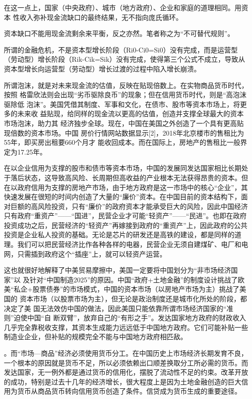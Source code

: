 在这一点上，国家（中央政府）、城市（地方政府）、企业和家庭的道理相同。用资本
性收入弥补现金流缺口的最终结果，无不指向庞氏循环。

资本缺口不能用现金流剩余来平衡，反之亦然。笔者称之为“不可替代规则”。

所谓的金融危机，不是资本型增长阶段（Ri0-Ci0=Si0）没有完成，而是运营型（劳动型）增长阶段（Rik-Cik=Sik）没有完成，使得第三个公式不成立，导致从资本型增长向运营型（劳动型）增长过渡的过程中陷入增长崩溃。

所谓泡沫，就是对未来现金流的估值，反映在贴现倍数上。在实物商品货币时代，按照
格雷欣法则会出现“劣币驱除良币”的现象；但在信用货币时代，则是“高泡沫驱除低
泡沫”。美国凭借其制度、军事和文化，在债市、股市等资本市场上，将更多的未来收
益贴现，给同样的现金流以更高的估值，创造并支撑全球最大的资本市场泡沫，助力其
经济独步全球。现在，中国在美国之外创造了一个具有更高贴现倍数的资本市场。中国
房价行情网站数据显示[2]，2018年北京楼市的售租比为55年，即买房出租要660个月才
能收回成本。而在国际上，房地产的售租比一般界定为17.25年。


在以企业信用为支撑的股市和债市等资本市场，中国的发展同发达国家相比长期处于落后状态，这导致高风险、长周期但高收益的产业根本无法获得昂贵的资本。但在以政府信用为支撑的房地产市场，由于地方政府是这一市场中的核心“企业”，其快速发展在很短的时间内创造了大量的“廉价”资本。在中国目前的资本结构下，面对巨额的高风险投资，只有“廉价”的政府资本才能承受巨大的风险，因此中国经济只有政府“重资产”——“国进”，民营企业才可能“轻资产”——“民进”。也即在政府投资成功之后，民营经济的“轻资产”再嫁接到政府的“重资产”上，因此政府的公共投资是企业私人投资的基础。无论是芯片的研发还是高铁的建设，都是同样的道理。我们可以把民营经济比作各种各样的电器，民营企业无须自建煤矿、电厂和电网，只需插到政府这个“插座”上，就可以轻资产运营。

这也就很好地解释了中美贸易摩擦中，美国一定要将中国划分为“非市场经济国家”以
及针对“中国制造2025”的原因。中国“政府+土地金融”的制度设计挑战了欧
美“私企+股票债券”的市场模式，中国的资本市场（以房地产市场为主）挑战了美国的
资本市场（以股票市场为主），但无论是政治制度还是城市化所处的阶段，都决定了美
国无法效仿中国的做法，因此美国只能依靠所谓市场经济国家的“准则”迫使中国“自
断双臂”，放弃自己的“有形之手”。发达国家地方政府的财政收入几乎完全靠税收支撑，其资本生成能力远远低于中国地方政府。它们可能补贴一些制造业企业，但补贴的规模完全不能与中国地方政府相匹敌。

。而“市场—商品”经济必须使用货币分工。在中国历史上市场经济长期发育不良，一个根本的原因就是货币不足，所以必须依赖出口顺差换取分工所必需的货币。而发达国家，无一例外都是通过货币的信用化，摆脱了流动性不足的约束。改革开放的成功，特别是过去十几年的经济增长，很大程度上是因为土地金融创造的巨大信用为货币从商品货币转向信用货币创造了条件。信贷成为货币生成的重要途径。



